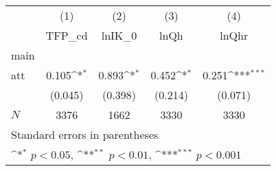 {
\def\sym#1{\ifmmode^{#1}\else\(^{#1}\)\fi}
\begin{tabular}{l*{4}{c}}
\hline\hline
            &\multicolumn{1}{c}{(1)}&\multicolumn{1}{c}{(2)}&\multicolumn{1}{c}{(3)}&\multicolumn{1}{c}{(4)}\\
            &\multicolumn{1}{c}{TFP\_cd}&\multicolumn{1}{c}{lnIK\_0}&\multicolumn{1}{c}{lnQh}&\multicolumn{1}{c}{lnQhr}\\
\hline
main        &                     &                     &                     &                     \\
att         &       0.105\sym{*}  &       0.893\sym{*}  &       0.452\sym{*}  &       0.251\sym{***}\\
            &     (0.045)         &     (0.398)         &     (0.214)         &     (0.071)         \\
\hline
\(N\)       &        3376         &        1662         &        3330         &        3330         \\
\hline\hline
\multicolumn{5}{l}{\footnotesize Standard errors in parentheses}\\
\multicolumn{5}{l}{\footnotesize \sym{*} \(p<0.05\), \sym{**} \(p<0.01\), \sym{***} \(p<0.001\)}\\
\end{tabular}
}

